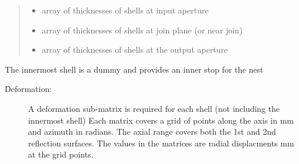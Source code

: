 \documentclass[letterpaper,10pt,english]{sphinxmanual}
\begin{document}
\begin{fulllineitems}
\begin{quote}
\begin{description}
\begin{itemize}
\item {} 
 \textendash{} array of thicknesses of shells at input aperture

\item {} 
 \textendash{} array of thicknesses of shells at join plane (or near join)

\item {} 
 \textendash{} array of thicknesses of shells at the output aperture

\end{itemize}

\end{description}\end{quote}

The innermost shell is a dummy and provides an inner stop for the nest
\begin{description}
\item[{Deformation:}] \leavevmode
A deformation sub-matrix is required for each shell (not
including the innermost shell)
Each matrix covers a grid of points along the axis in mm and azimuth
in radians. The axial range covers both the 1st and 2nd reflection
surfaces.
The values in the matrices are radial displacments mm at the grid
points.

\end{description}

\end{fulllineitems}

\end{document}
